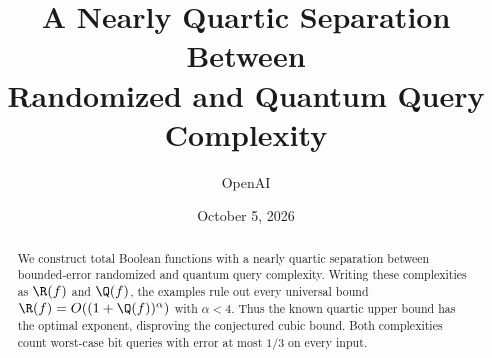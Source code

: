 \documentclass[11pt]{article}
\title{A Nearly Quartic Separation Between\texorpdfstring{\\}{ }Randomized and Quantum Query Complexity}
\author{OpenAI}
\date{October 5, 2026}
\begin{document}
\maketitle
\begin{abstract}
We construct total Boolean functions with a nearly quartic separation
between bounded-error randomized and quantum query complexity.
Writing these complexities as $\R(f)$ and $\Q(f)$, the examples rule
out every universal bound $\R(f)=O((1+\Q(f))^\alpha)$ with
$\alpha<4$. Thus the known quartic upper bound has the optimal
exponent, disproving the conjectured cubic bound. Both complexities
count worst-case bit queries with error at most $1/3$ on every input.
\end{abstract}





\appendix



\end{document}
